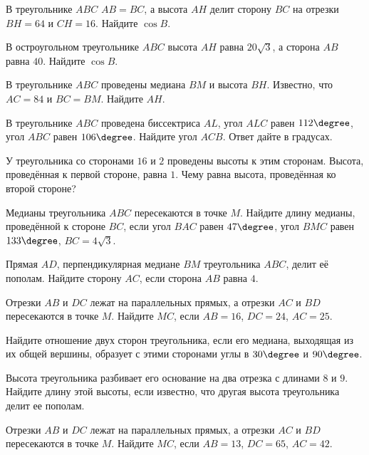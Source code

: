 \begin{class}[number=4]
	\begin{listofex}
		\item В треугольнике \( ABC \) \( AB=BC \), а высота \( AH \) делит сторону \( BC \) на отрезки \( BH=64 \) и \( CH=16 \). Найдите \( \cos B \).
		\item В остроугольном треугольнике \( ABC \) высота \( AH \) равна \( 20\sqrt{3} \), а сторона \( AB \) равна \( 40 \). Найдите \( \cos B \).
		\item В треугольнике \( ABC \) проведены медиана \( BM \) и высота \( BH \). Известно, что \( AC=84 \) и \( BC=BM \). Найдите \( AH \).
		\item В треугольнике \( ABC \) проведена биссектриса \( AL \), угол \( ALC \) равен \( 112\degree \), угол \( ABC \) равен \( 106\degree \). Найдите угол \( ACB \). Ответ дайте в градусах.
		\item У треугольника со сторонами \( 16 \) и \( 2 \) проведены высоты к этим сторонам. Высота, проведённая к первой стороне, равна \( 1 \). Чему равна высота, проведённая ко второй стороне?
		\item Медианы треугольника \( ABC \) пересекаются в точке \( M \). Найдите длину медианы, проведённой к стороне \( BC \), если угол \( BAC \) равен \( 47\degree \), угол \( BMC \) равен \( 133\degree \), \( BC=4\sqrt{3} \).
		\item Прямая \( AD \), перпендикулярная медиане \( BM \) треугольника \( ABC \), делит её пополам. Найдите сторону \( AC \), если сторона \( AB \) равна \( 4 \).
		\item Отрезки \( AB \) и \( DC \) лежат на параллельных прямых, а отрезки \( AC \) и \( BD \) пересекаются в точке \( M \). Найдите \( MC \), если \( AB=16 \), \( DC=24 \), \( AC=25 \).
		\item Найдите отношение двух сторон треугольника, если его медиана, выходящая из их общей вершины, образует с этими сторонами углы в \( 30\degree \) и \( 90\degree \).
		\item Высота треугольника разбивает его основание на два отрезка с длинами \( 8 \) и \( 9 \). Найдите длину этой высоты, если известно, что другая высота треугольника делит ее пополам.
		\item Отрезки \( AB \) и \( DC \) лежат на параллельных прямых, а отрезки \( AC \) и \( BD \) пересекаются в точке \( M \). Найдите \( MC \), если \( AB=13 \), \( DC=65 \), \( AC=42 \).
	\end{listofex}
\end{class}

